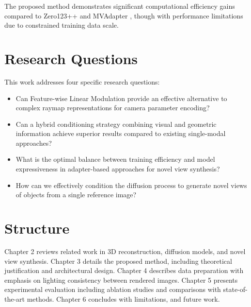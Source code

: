 The proposed method demonstrates significant computational efficiency gains compared to Zero123++ \cite{zero1to3} and MVAdapter \cite{mvadapter}, though with performance limitations due to constrained training data scale.

\section{Research Questions}

This work addresses four specific research questions:
\begin{itemize}
  \item Can Feature-wise Linear Modulation provide an effective alternative to complex raymap representations for camera parameter encoding?
  \item Can a hybrid conditioning strategy combining visual and geometric information achieve superior results compared to existing single-modal approaches?
  \item What is the optimal balance between training efficiency and model expressiveness in adapter-based approaches for novel view synthesis?
  \item How can we effectively condition the diffusion process to generate novel views of objects from a single reference image?
\end{itemize}

\section{Structure}

Chapter 2 reviews related work in 3D reconstruction, diffusion models, and novel view synthesis. Chapter 3 details the proposed method, including theoretical justification and architectural design. Chapter 4 describes data preparation with emphasis on lighting consistency between rendered images. Chapter 5 presents experimental evaluation including ablation studies and comparisons with state-of-the-art methods. Chapter 6 concludes with limitations, and future work.
